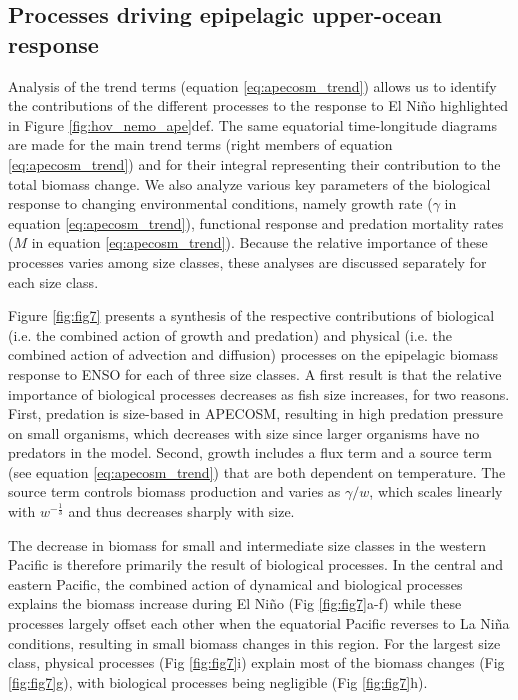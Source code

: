\subsection{Processes driving epipelagic upper-ocean response}

Analysis of the trend terms (equation \ref{eq:apecosm_trend}) allows us to identify the contributions of the different processes to the response to El Niño highlighted in Figure \ref{fig:hov_nemo_ape}def. The same equatorial time-longitude diagrams are made for the main trend terms (right members of equation \ref{eq:apecosm_trend}) and for their integral representing their contribution to the total biomass change. We also analyze various key parameters of the biological response to changing environmental conditions, namely growth rate ($\gamma$ in equation \ref{eq:apecosm_trend}), functional response and predation mortality rates ($M$ in equation \ref{eq:apecosm_trend}). Because the relative importance of these processes varies among size classes, these analyses are discussed separately for each size class.

Figure \ref{fig:fig7} presents a synthesis of the respective contributions of biological (i.e. the combined action of growth and predation) and physical (i.e. the combined action of advection and diffusion) processes on the epipelagic biomass response to ENSO for each of three size classes. A first result is that the relative importance of biological processes decreases as fish size increases, for two reasons. First, predation is size-based in APECOSM, resulting in high predation pressure on small organisms, which decreases with size since larger organisms have no predators in the model. Second, growth includes a flux term and a source term (see equation \ref{eq:apecosm_trend}) that are both dependent on temperature. The source term controls biomass production and varies as ${\gamma}/{w}$, which scales linearly with $w^{-\frac{1}{3}}$ and thus decreases sharply with size.

The decrease in biomass for small and intermediate size classes in the western Pacific is therefore primarily the result of biological processes. In the central and eastern Pacific, the combined action of dynamical and biological processes explains the biomass increase during El Niño (Fig \ref{fig:fig7}a-f) while these processes largely offset each other when the equatorial Pacific reverses to La Niña conditions, resulting in small biomass changes in this region. For the largest size class, physical processes (Fig \ref{fig:fig7}i) explain most of the biomass changes (Fig \ref{fig:fig7}g), with biological processes being negligible (Fig \ref{fig:fig7}h).

